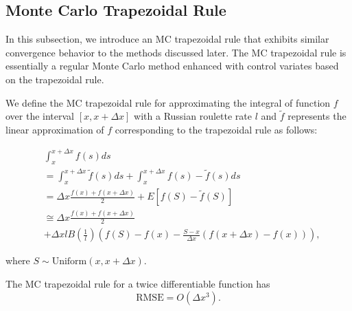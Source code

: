\documentclass[a4paper,12pt]{article}
\begin{document}
\subsection{Monte Carlo Trapezoidal Rule}

In this subsection, we introduce an MC trapezoidal rule that
exhibits similar convergence behavior to the methods discussed later.
The MC trapezoidal rule is essentially a regular Monte Carlo method
enhanced with control variates based on the trapezoidal rule.

\begin{definition}
  We define the MC trapezoidal rule for approximating the integral
  of function $f$ over the interval $[x, x+\Delta x]$ with a Russian roulette rate
  $l$ and $\tilde{f}$ represents the linear approximation of $f$ corresponding
  to the trapezoidal rule as follows:

  \begin{align}
     & \int_{x}^{x+\Delta x} f(s) ds                           \\
     & = \int_{x}^{x+\Delta x}  \tilde{f}(s) ds +
    \int_{x}^{x+\Delta x}  f(s) - \tilde{f}(s) ds              \\
     & = \Delta x \frac{f(x) + f(x+\Delta x)}{2}
    + E \left[f(S) - \tilde{f}(S)\right]                       \\
     & \cong \Delta x \frac{f(x) + f(x+\Delta x)}{2} \nonumber \\
     & + \Delta x l B\left( \frac{1}{l}\right)
    \left(f(S) - f(x) - \frac{S - x}{\Delta x}
    \left(f(x+\Delta x) - f(x)\right) \right), \label{eq:MCtrap}
  \end{align}

  where $S \sim \text{Uniform}(x,x+\Delta x)$.
\end{definition}

\begin{lemma} \label{lem:rmse mctrap}
  The MC trapezoidal rule
  for a twice differentiable function has
  \begin{equation}
    \text{RMSE} =O\left( \Delta x^{3} \right) .
  \end{equation}
\end{lemma}
\end{document}
